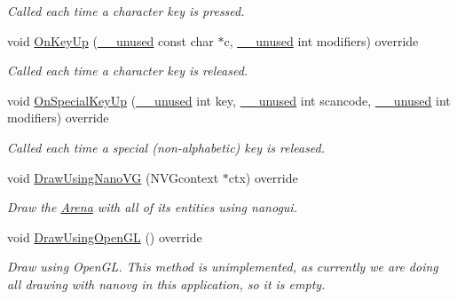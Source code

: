 \begin{DoxyCompactItemize}
\begin{DoxyCompactList}\small\item\em Called each time a character key is pressed. \end{DoxyCompactList}\item 
void \mbox{\hyperlink{class_graphics_arena_viewer_ac3e749f6a75bdd5b32d23c9c8913f9d8}{On\+Key\+Up}} (\mbox{\hyperlink{common_8h_a2e3484535ee610c8e19e9859563abe48}{\+\_\+\+\_\+unused}} const char $\ast$c, \mbox{\hyperlink{common_8h_a2e3484535ee610c8e19e9859563abe48}{\+\_\+\+\_\+unused}} int modifiers) override
\begin{DoxyCompactList}\small\item\em Called each time a character key is released. \end{DoxyCompactList}\item 
void \mbox{\hyperlink{class_graphics_arena_viewer_a086e2e29e1a5745a8ee4f12996897b22}{On\+Special\+Key\+Up}} (\mbox{\hyperlink{common_8h_a2e3484535ee610c8e19e9859563abe48}{\+\_\+\+\_\+unused}} int key, \mbox{\hyperlink{common_8h_a2e3484535ee610c8e19e9859563abe48}{\+\_\+\+\_\+unused}} int scancode, \mbox{\hyperlink{common_8h_a2e3484535ee610c8e19e9859563abe48}{\+\_\+\+\_\+unused}} int modifiers) override
\begin{DoxyCompactList}\small\item\em Called each time a special (non-\/alphabetic) key is released. \end{DoxyCompactList}\item 
void \mbox{\hyperlink{class_graphics_arena_viewer_a7d59755e3f7674f382127fe135492eeb}{Draw\+Using\+Nano\+VG}} (N\+V\+Gcontext $\ast$ctx) override
\begin{DoxyCompactList}\small\item\em Draw the \mbox{\hyperlink{class_arena}{Arena}} with all of its entities using {\ttfamily nanogui}. \end{DoxyCompactList}\item 
\mbox{\label{class_graphics_arena_viewer_af894508bfa039199c6ff7f1b5a7da158}} 
void \mbox{\hyperlink{class_graphics_arena_viewer_af894508bfa039199c6ff7f1b5a7da158}{Draw\+Using\+Open\+GL}} () override
\begin{DoxyCompactList}\small\item\em Draw using {\ttfamily Open\+GL}. This method is unimplemented, as currently we are doing all drawing with {\ttfamily nanovg} in this application, so it is empty. \end{DoxyCompactList}\item 

\end{DoxyCompactItemize}
